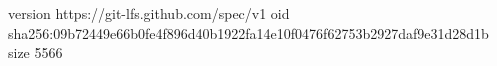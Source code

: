 version https://git-lfs.github.com/spec/v1
oid sha256:09b72449e66b0fe4f896d40b1922fa14e10f0476f62753b2927daf9e31d28d1b
size 5566
